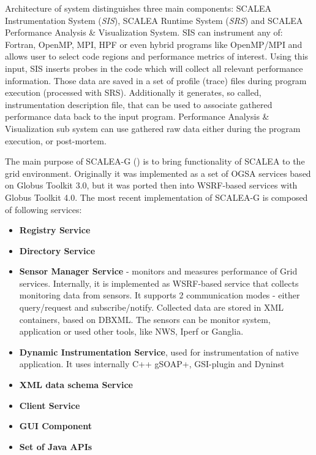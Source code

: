 Architecture of system distinguishes three main components: SCALEA Instrumentation System (\emph{SIS}),
SCALEA Runtime System (\emph{SRS}) and SCALEA
Performance Analysis \& Visualization System. SIS can instrument any of: Fortran, OpenMP, MPI, HPF or even
hybrid programs like OpenMP/MPI and allows user to
select code regions and performance metrics of interest. Using this input, SIS inserts probes in the code which will
collect all relevant performance information. Those
data are saved in a set of profile (trace) files during program execution (processed with SRS). Additionally it
generates, so called, instrumentation description file, that
can be used to associate gathered performance data back to the input program. Performance Analysis \&
Visualization sub system can use gathered raw data either
during the program execution, or post-mortem.

The main purpose of SCALEA-G (\cite{SCALEA2, SCALEA3}) is to bring functionality of SCALEA to the grid
environment. Originally it was implemented as a set of OGSA services based on Globus Toolkit 3.0, but it was
ported then into WSRF-based services with Globus Toolkit 4.0. The most recent implementation of SCALEA-G is
composed of following services:

\begin{itemize}
\item{ {\bf Registry Service}}
\item{ {\bf Directory Service}}
\item{ {\bf Sensor Manager Service} - monitors and measures performance of Grid services. Internally, it is
implemented as WSRF-based service that collects monitoring data from sensors. It supports 2 communication
modes - either query/request and subscribe/notify. Collected data are stored in XML containers, based on DBXML.
The sensors can be monitor system, application or used other tools, like NWS, Iperf or Ganglia.}
\item{ {\bf Dynamic Instrumentation Service}, used for instrumentation of native application. It uses internally C++ gSOAP+, GSI-plugin and Dyninst}
\item{ {\bf XML data schema Service}}
\item{ {\bf Client Service}}
\item{ {\bf GUI Component}}
\item{ {\bf Set of Java APIs}}
\end{itemize}


